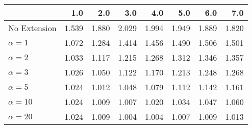 \begin{tabular}{lrrrrrrr}
\toprule
{} &   1.0 &   2.0 &   3.0 &   4.0 &   5.0 &   6.0 &   7.0 \\
\midrule
No Extension  & 1.539 & 1.880 & 2.029 & 1.994 & 1.949 & 1.889 & 1.820 \\
$\alpha = 1$  & 1.072 & 1.284 & 1.414 & 1.456 & 1.490 & 1.506 & 1.501 \\
$\alpha = 2$  & 1.033 & 1.117 & 1.215 & 1.268 & 1.312 & 1.346 & 1.357 \\
$\alpha = 3$  & 1.026 & 1.050 & 1.122 & 1.170 & 1.213 & 1.248 & 1.268 \\
$\alpha = 5$  & 1.024 & 1.012 & 1.048 & 1.079 & 1.112 & 1.142 & 1.161 \\
$\alpha = 10$ & 1.024 & 1.009 & 1.007 & 1.020 & 1.034 & 1.047 & 1.060 \\
$\alpha = 20$ & 1.024 & 1.009 & 1.004 & 1.004 & 1.007 & 1.009 & 1.013 \\
\bottomrule
\end{tabular}
